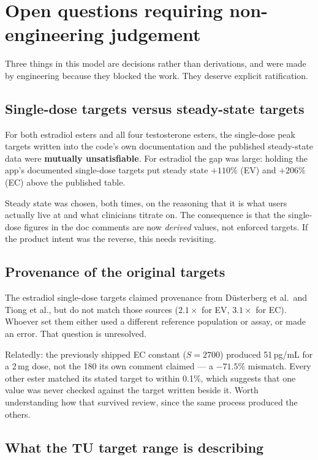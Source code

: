 \documentclass[11pt,a4paper]{article}
\begin{document}
\section{Open questions requiring non-engineering judgement}
\label{sec:openquestions}

Three things in this model are decisions rather than derivations, and were made by
engineering because they blocked the work. They deserve explicit ratification.

\subsection{Single-dose targets versus steady-state targets}

For both estradiol esters and all four testosterone esters, the single-dose peak
targets written into the code's own documentation and the published steady-state
data were \textbf{mutually unsatisfiable}. For estradiol the gap was large:
holding the app's documented single-dose targets put steady state $+110\%$ (EV)
and $+206\%$ (EC) above the published table.

Steady state was chosen, both times, on the reasoning that it is what users
actually live at and what clinicians titrate on. The consequence is that the
single-dose figures in the doc comments are now \emph{derived} values, not
enforced targets. If the product intent was the reverse, this needs revisiting.

\subsection{Provenance of the original targets}

The estradiol single-dose targets claimed provenance from Düsterberg et al.\ and
Tiong et al., but do not match those sources ($2.1\times$ for EV, $3.1\times$ for
EC). Whoever set them either used a different reference population or assay, or
made an error. That question is unresolved.

Relatedly: the previously shipped EC constant ($S = 2700$) produced 51\,pg/mL for
a 2\,mg dose, not the 180 its own comment claimed --- a $-71.5\%$ mismatch. Every
other ester matched its stated target to within 0.1\%, which suggests that one
value was never checked against the target written beside it. Worth understanding
how that survived review, since the same process produced the others.

\subsection{What the TU target range is describing}
\end{document}
